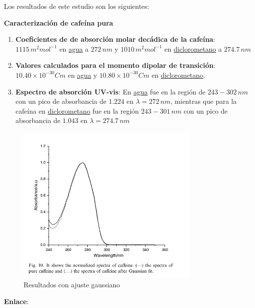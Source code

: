 \documentclass{article}
\begin{document}
Los resultados de este estudio son los siguientes:	


\textbf{Caracterización de cafeína pura} \vspace{0.5cm}

\begin{enumerate}
	\item \textbf{Coeficientes de de absorción molar decádica de la cafeína}:  $1115 \, m^{2} mol^{-1}$ en \underline{agua} a $272 \, nm$ y $1010 \, m^{2} mol^{-1}$ en \underline{diclorometano} a $274\text{.}7 \, nm$ 
	\item \textbf{Valores calculados para el momento dipolar de transición}: $10\text{.}40 \times 10^{-30} Cm$ en \underline{agua} y $10\text{.}80 \times 10^{-30} Cm$ en \underline{diclorometano}.\\
	\item \textbf{Espectro de absorción UV-vis}: En \underline{agua} fue en la región de $243-302\, nm$ con un pico de absorbancia de $1\text{.}224$ en $\lambda =272 \, nm$, mientras que para la cafeína en \underline{diclorometano} fue en la región $243-301\, nm$ con un pico de absorbancia de $1\text{.}043$ en $\lambda =274\text{.}7 \, nm$
\end{enumerate}

\begin{figure}[H]
	\centering
	\includegraphics[width=0.8\textwidth]{images/absorbancia_cafeína.png}
	\caption{Resultados con ajuste gaussiano}
	\label{fig:ajuste-gaussiano}
\end{figure} \vspace{0.5cm}

\textbf{Enlace}: \vspace{0.5cm}
\end{document}
